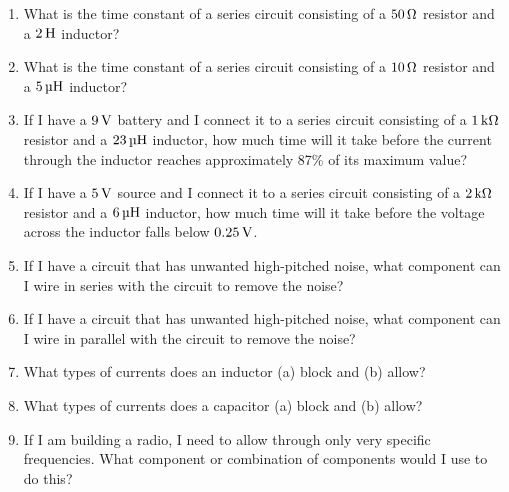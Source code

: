 \applysection

\begin{enumerate}
\item What is the time constant of a series circuit consisting of a $50\,\si{\ohm}$ resistor and a $2\myhy$ inductor?
\item What is the time constant of a series circuit consisting of a $10\,\si{\ohm}$ resistor and a $5\myuhy$ inductor?
\item If I have a $9\,\si{\volt}$ battery and I connect it to a series circuit consisting of a $1\,\si{\kilo\ohm}$ resistor and a $23\myuhy$ inductor, how much time will it take before the current through the inductor reaches approximately 87\% of its maximum value?
\item If I have a $5\,\si{\volt}$ source and I connect it to a series circuit consisting of a $2\,\si{\kilo\ohm}$ resistor and a $6\myuhy$ inductor, how much time will it take before the voltage across the inductor falls below $0.25\,\si{\volt}$.
\item If I have a circuit that has unwanted high-pitched noise, what component can I wire in series with the circuit to remove the noise?
\item If I have a circuit that has unwanted high-pitched noise, what component can I wire in parallel with the circuit to remove the noise?
\item What types of currents does an inductor (a) block and (b) allow?
\item What types of currents does a capacitor (a) block and (b) allow?
\item If I am building a radio, I need to allow through only very specific frequencies.  What component or combination of components would I use to do this?
\end{enumerate}

